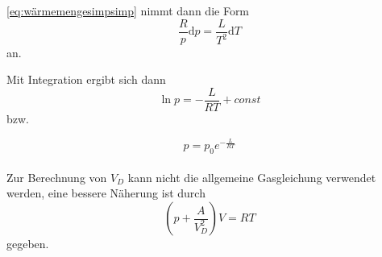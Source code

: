 \eqref{eq:wärmemengesimpsimp} nimmt dann die Form
\begin{equation}
    \frac{R}{p} \mathrm{d}p = \frac{L}{T^2} \mathrm{d}T
\end{equation} an.

Mit Integration ergibt sich dann
\begin{equation}
    \ln p = - \frac{L}{RT} + const
    \label{eq:lnp}
\end{equation} bzw.

\begin{equation}
    p = p_0 e^{-\frac{L}{RT}}
    \label{eq:p}
\end{equation}\\

Zur Berechnung von $V_D$ kann nicht die allgemeine Gasgleichung verwendet werden, eine bessere
Näherung ist durch
\begin{equation}
    \left(p + \frac{A}{V^2_D}\right) V = R T
    \label{eq:approxV_D}
\end{equation} gegeben.


